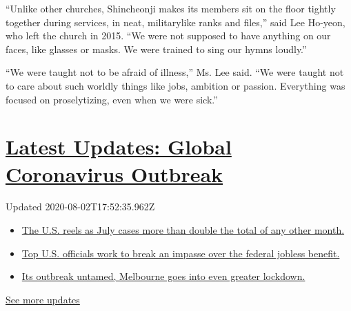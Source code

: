 ``Unlike other churches, Shincheonji makes its members sit on the floor
tightly together during services, in neat, militarylike ranks and
files,'' said Lee Ho-yeon, who left the church in 2015. ``We were not
supposed to have anything on our faces, like glasses or masks. We were
trained to sing our hymns loudly.''

``We were taught not to be afraid of illness,'' Ms. Lee said. ``We were
taught not to care about such worldly things like jobs, ambition or
passion. Everything was focused on proselytizing, even when we were
sick.''

\hypertarget{latest-updates-global-coronavirus-outbreak}{%
\section{\texorpdfstring{\href{https://www.nytimes.com/2020/08/01/world/coronavirus-covid-19.html?action=click\&pgtype=Article\&state=default\&region=MAIN_CONTENT_1\&context=storylines_live_updates}{Latest
Updates: Global Coronavirus
Outbreak}}{Latest Updates: Global Coronavirus Outbreak}}\label{latest-updates-global-coronavirus-outbreak}}

Updated 2020-08-02T17:52:35.962Z

\begin{itemize}
\tightlist
\item
  \href{https://www.nytimes.com/2020/08/01/world/coronavirus-covid-19.html?action=click\&pgtype=Article\&state=default\&region=MAIN_CONTENT_1\&context=storylines_live_updates\#link-34047410}{The
  U.S. reels as July cases more than double the total of any other
  month.}
\item
  \href{https://www.nytimes.com/2020/08/01/world/coronavirus-covid-19.html?action=click\&pgtype=Article\&state=default\&region=MAIN_CONTENT_1\&context=storylines_live_updates\#link-780ec966}{Top
  U.S. officials work to break an impasse over the federal jobless
  benefit.}
\item
  \href{https://www.nytimes.com/2020/08/01/world/coronavirus-covid-19.html?action=click\&pgtype=Article\&state=default\&region=MAIN_CONTENT_1\&context=storylines_live_updates\#link-2bc8948}{Its
  outbreak untamed, Melbourne goes into even greater lockdown.}
\end{itemize}

\href{https://www.nytimes.com/2020/08/01/world/coronavirus-covid-19.html?action=click\&pgtype=Article\&state=default\&region=MAIN_CONTENT_1\&context=storylines_live_updates}{See
more updates}

